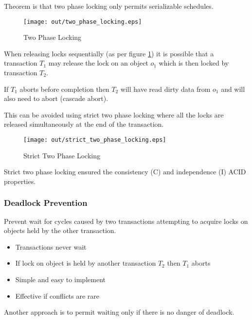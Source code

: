 \documentclass[a4paper]{article}
\begin{document}
Theorem is that two phase locking only permits serializable schedules.

\begin{figure}[h!]
  \centering
  \texttt{[image: out/two\_phase\_locking.eps]}
  \caption{Two Phase Locking}
  \label{fig:two_phase_locking}
\end{figure}
\FloatBarrier

When releasing locks sequentially (as per figure \ref{fig:two_phase_locking}) it
is possible that a transaction $T_{1}$ may release the lock on an object $o_{1}$
which is then locked by transaction $T_{2}$.

If $T_{1}$ aborts before completion then $T_{2}$ will have read dirty data from
$o_{1}$ and will also need to abort (cascade abort).

This can be avoided using strict two phase locking where all the locks are
released simultaneously at the end of the transaction.

\begin{figure}[h!]
  \centering
  \texttt{[image: out/strict\_two\_phase\_locking.eps]}
  \caption{Strict Two Phase Locking}
  \label{fig:strict_two_phase_locking}
\end{figure}
\FloatBarrier

Strict two phase locking ensured the consistency (C) and independence (I)
ACID properties.

\subsubsection{Deadlock Prevention}
\label{sec:deadlock_prevention}

Prevent wait for cycles caused by two transactions attempting to acquire locks
on objects held by the other transaction.


\begin{itemize}
  \item Transactions never wait
  \item If lock on object is held by another transaction $T_{2}$ then $T_{1}$
        aborts
  \item Simple and easy to implement
  \item Effective if conflicts are rare
\end{itemize}


Another approach is to permit waiting only if there is no danger of deadlock.
\end{document}
